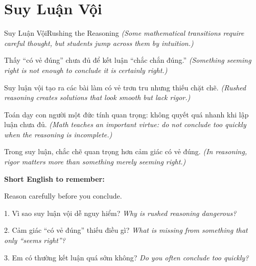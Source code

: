 \section{Suy Luận Vội}
\begin{truyen}{Suy Luận Vội}{Rushing the Reasoning}
\textit{(Some mathematical transitions require careful thought, but students jump across them by intuition.)}

Thấy ``có vẻ đúng'' chưa đủ để kết luận ``chắc chắn đúng.''
\textit{(Something seeming right is not enough to conclude it is certainly right.)}

Suy luận vội tạo ra các bài làm có vẻ trơn tru nhưng thiếu chặt chẽ.
\textit{(Rushed reasoning creates solutions that look smooth but lack rigor.)}

Toán dạy con người một đức tính quan trọng: không quyết quá nhanh khi lập luận chưa đủ.
\textit{(Math teaches an important virtue: do not conclude too quickly when the reasoning is incomplete.)}
\end{truyen}

\begin{baihoc}
Trong suy luận, chắc chẽ quan trọng hơn cảm giác có vẻ đúng.
\textit{(In reasoning, rigor matters more than something merely seeming right.)}
\end{baihoc}

\begin{ghinhoanh}
\textbf{Short English to remember:}

Reason carefully before you conclude.

\end{ghinhoanh}

\begin{tuhocnhanh}
1. Vì sao suy luận vội dễ nguy hiểm? \textit{Why is rushed reasoning dangerous?}

2. Cảm giác ``có vẻ đúng'' thiếu điều gì? \textit{What is missing from something that only ``seems right''?}

3. Em có thường kết luận quá sớm không? \textit{Do you often conclude too quickly?}
\end{tuhocnhanh}
\ngancach

